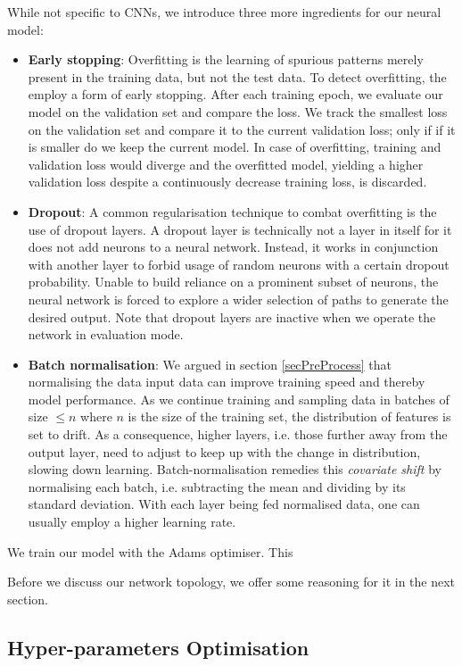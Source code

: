 \documentclass[british,12p]{article}
\begin{document}
    While not specific to CNNs, we introduce three more ingredients for our neural model:
    \begin{itemize}
    	\item \textbf{Early stopping}: Overfitting is the learning of spurious patterns merely present in the training data, but not the test data. To detect overfitting, the employ a form of early stopping. After each training epoch, we evaluate our model on the validation set and compare the loss. We track the smallest loss on the validation set and compare it to the current validation loss; only if if it is smaller do we keep the current model. In case of overfitting, training and validation loss would diverge and the overfitted model, yielding a higher validation loss despite a continuously decrease training loss, is discarded.
        \item \textbf{Dropout}:	A common regularisation technique to combat overfitting is the use of dropout layers. A dropout layer is technically not a layer in itself for it does not add neurons to a neural network. Instead, it works in conjunction with another layer to forbid usage of random neurons with a certain dropout probability. Unable to build reliance on a prominent subset of neurons, the neural network is forced to explore a wider selection of paths to generate the desired output. Note that dropout layers are inactive when we operate the network in evaluation mode. 
    	\item \textbf{Batch normalisation}: We argued in section \ref{secPreProcess} that normalising the data input data can improve training speed and thereby model performance. As we continue training and sampling data in batches of size $\le n$ where $n$ is the size of the training set, the distribution of features is set to drift. As a consequence, higher layers, i.e. those further away from the output layer, need to adjust to keep up with the change in distribution, slowing down learning. Batch-normalisation remedies this \textit{covariate shift} by normalising each batch, i.e. subtracting the mean and dividing by its standard deviation. With each layer being fed normalised data, one can usually employ a higher learning rate. 
    \end{itemize}
    
    We train our model with the Adams optimiser. This 
    
    Before we discuss our network topology, we offer some reasoning for it in the next section.

 	
    \subsection{Hyper-parameters Optimisation}
    
\end{document}
